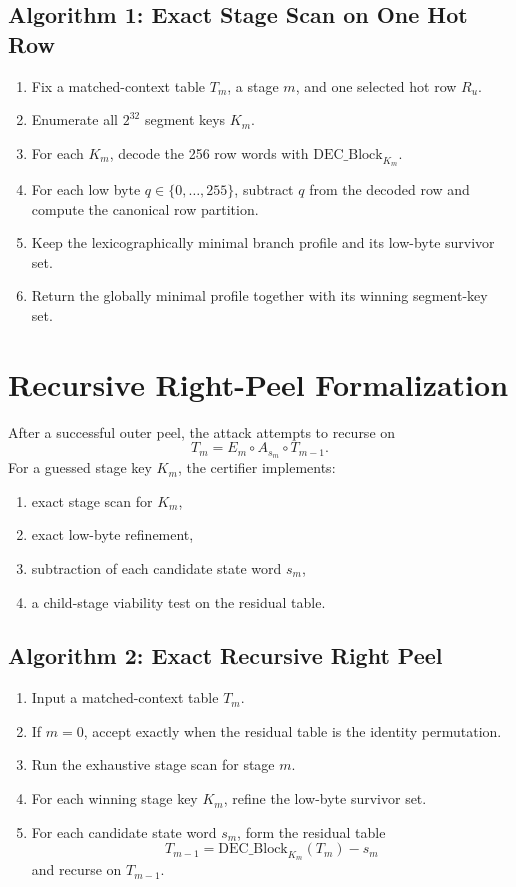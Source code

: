 \documentclass[11pt]{article}
\begin{document}
\subsection*{Algorithm 1: Exact Stage Scan on One Hot Row}
\begin{enumerate}
\item Fix a matched-context table \(T_m\), a stage \(m\), and one selected hot row \(R_u\).
\item Enumerate all \(2^{32}\) segment keys \(K_m\).
\item For each \(K_m\), decode the 256 row words with \(\mathrm{DEC\_Block}_{K_m}\).
\item For each low byte \(q\in\{0,\dots,255\}\), subtract \(q\) from the decoded row and compute the canonical row partition.
\item Keep the lexicographically minimal branch profile and its low-byte survivor set.
\item Return the globally minimal profile together with its winning segment-key set.
\end{enumerate}

\section{Recursive Right-Peel Formalization}
After a successful outer peel, the attack attempts to recurse on
\[
T_m = E_m\circ A_{s_m}\circ T_{m-1}.
\]
For a guessed stage key \(K_m\), the certifier implements:
\begin{enumerate}
\item exact stage scan for \(K_m\),
\item exact low-byte refinement,
\item subtraction of each candidate state word \(s_m\),
\item a child-stage viability test on the residual table.
\end{enumerate}

\subsection*{Algorithm 2: Exact Recursive Right Peel}
\begin{enumerate}
\item Input a matched-context table \(T_m\).
\item If \(m=0\), accept exactly when the residual table is the identity permutation.
\item Run the exhaustive stage scan for stage \(m\).
\item For each winning stage key \(K_m\), refine the low-byte survivor set.
\item For each candidate state word \(s_m\), form the residual table
\[
T_{m-1}=\mathrm{DEC\_Block}_{K_m}(T_m)-s_m
\]
and recurse on \(T_{m-1}\).
\end{enumerate}
\end{document}
